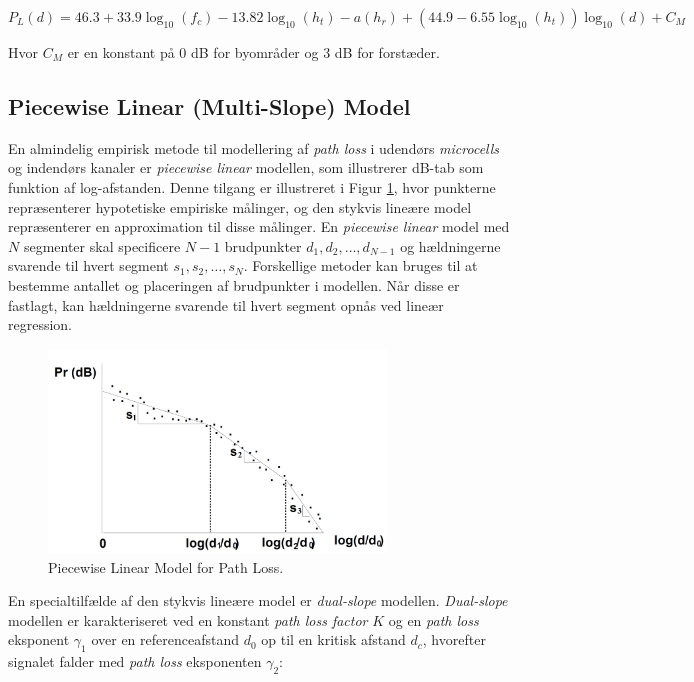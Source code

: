 \documentclass[a4paper,12pt]{book}
\begin{document}
	\[
	P_L(d) = 46.3 + 33.9 \log_{10}(f_c) - 13.82 \log_{10}(h_t) - a(h_r) + \left( 44.9 - 6.55 \log_{10}(h_t) \right) \log_{10}(d) + C_M
	\]
	
	Hvor \( C_M \) er en konstant på 0 dB for byområder og 3 dB for forstæder.
	
	\subsection{Piecewise Linear (Multi-Slope) Model}
	
	En almindelig empirisk metode til modellering af \textit{path loss} i udendørs \textit{microcells} og indendørs kanaler er \textit{piecewise linear} modellen, som illustrerer dB-tab som funktion af log-afstanden. Denne tilgang er illustreret i Figur \ref{fig:piecewise_linear_model}, hvor punkterne repræsenterer hypotetiske empiriske målinger, og den stykvis lineære model repræsenterer en approximation til disse målinger. En \textit{piecewise linear} model med \(N\) segmenter skal specificere \(N-1\) brudpunkter \(d_1, d_2, \ldots, d_{N-1}\) og hældningerne svarende til hvert segment \(s_1, s_2, \ldots, s_N\). Forskellige metoder kan bruges til at bestemme antallet og placeringen af brudpunkter i modellen. Når disse er fastlagt, kan hældningerne svarende til hvert segment opnås ved lineær regression.
	
	\begin{figure}[h]
		\centering
		\includegraphics[width=0.8\textwidth]{fig/fig9.png}
		\caption{Piecewise Linear Model for Path Loss.}
		\label{fig:piecewise_linear_model}
	\end{figure}
	
	En specialtilfælde af den stykvis lineære model er \textit{dual-slope} modellen. \textit{Dual-slope} modellen er karakteriseret ved en konstant \textit{path loss factor} \(K\) og en \textit{path loss} eksponent \( \gamma_1 \) over en referenceafstand \( d_0 \) op til en kritisk afstand \( d_c \), hvorefter signalet falder med \textit{path loss} eksponenten \( \gamma_2 \):
	
\end{document}
